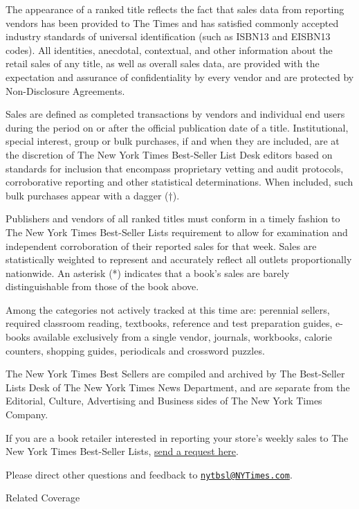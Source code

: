 The appearance of a ranked title reflects the fact that sales data from
reporting vendors has been provided to The Times and has satisfied
commonly accepted industry standards of universal identification (such
as ISBN13 and EISBN13 codes). All identities, anecdotal, contextual, and
other information about the retail sales of any title, as well as
overall sales data, are provided with the expectation and assurance of
confidentiality by every vendor and are protected by Non-Disclosure
Agreements.

Sales are defined as completed transactions by vendors and individual
end users during the period on or after the official publication date of
a title. Institutional, special interest, group or bulk purchases, if
and when they are included, are at the discretion of The New York Times
Best-Seller List Desk editors based on standards for inclusion that
encompass proprietary vetting and audit protocols, corroborative
reporting and other statistical determinations. When included, such bulk
purchases appear with a dagger (†).

Publishers and vendors of all ranked titles must conform in a timely
fashion to The New York Times Best-Seller Lists requirement to allow for
examination and independent corroboration of their reported sales for
that week. Sales are statistically weighted to represent and accurately
reflect all outlets proportionally nationwide. An asterisk (*) indicates
that a book's sales are barely distinguishable from those of the book
above.

Among the categories not actively tracked at this time are: perennial
sellers, required classroom reading, textbooks, reference and test
preparation guides, e-books available exclusively from a single vendor,
journals, workbooks, calorie counters, shopping guides, periodicals and
crossword puzzles.

The New York Times Best Sellers are compiled and archived by The
Best-Seller Lists Desk of The New York Times News Department, and are
separate from the Editorial, Culture, Advertising and Business sides of
The New York Times Company.

If you are a book retailer interested in reporting your store's weekly
sales to The New York Times Best-Seller Lists,
\href{https://bestsellers.nytimes3xbfgragh.onion/newstoreapp}{send a
request here}.

Please direct other questions and feedback to
\href{mailto:nytbsl@NYTimes.com}{\nolinkurl{nytbsl@NYTimes.com}}.

Related Coverage

